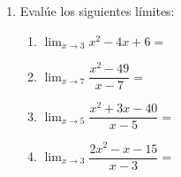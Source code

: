 \documentclass[letterpaper]{article}
\let\ds\displaystyle
\begin{document}
\begin{enumerate}
   \item Evalúe los siguientes límites:
   \begin{enumerate}
   \item $\ds{\lim_{x\rightarrow 3}x^{2}-4x+6}=$\noanswer
   \item $\ds{\lim_{x\rightarrow 7}\dfrac{x^{2}-49}{x-7}}=$\noanswer
   \item $\ds{\lim_{x\rightarrow 5}\dfrac{x^{2}+3x-40}{x-5}}=$\noanswer
   \item $\ds{\lim_{x\rightarrow 3}\dfrac{2x^{2}-x-15}{x-3}}=$\noanswer
   \end{enumerate}
 \end{enumerate}
\end{document}
